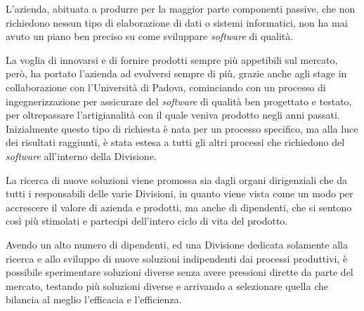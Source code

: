 L'azienda, abituata a produrre per la maggior parte componenti passive, che non richiedono nessun tipo di elaborazione di dati o sistemi informatici, non ha mai avuto un piano ben preciso su come sviluppare \textit{software} di qualità. 

La voglia di innovarsi e di fornire prodotti sempre più appetibili sul mercato, però, ha portato l'azienda ad evolversi sempre di più, grazie anche agli stage in collaborazione con l'Università di Padova, cominciando con un processo di ingegnerizzazione per assicurare del \textit{software} di qualità ben progettato e testato, per oltrepassare l'artigianalità con il quale veniva prodotto negli anni passati. Inizialmente questo tipo di richiesta è nata per un processo specifico, ma alla luce dei risultati raggiunti, è stata estesa a tutti gli altri processi che richiedono del \textit{software} all'interno della Divisione. 

La ricerca di nuove soluzioni viene promossa sia dagli organi dirigenziali che da tutti i responsabili delle varie Divisioni, in quanto viene vista come un modo per accrescere il valore di azienda e prodotti, ma anche di dipendenti, che si sentono così più stimolati e partecipi dell'intero ciclo di vita del prodotto.

Avendo un alto numero di dipendenti, ed una Divisione dedicata solamente alla ricerca e allo sviluppo di nuove soluzioni indipendenti dai processi produttivi, è possibile sperimentare soluzioni diverse senza avere pressioni dirette da parte del mercato, testando più soluzioni diverse e arrivando a selezionare quella che bilancia al meglio l'efficacia e l'efficienza. 